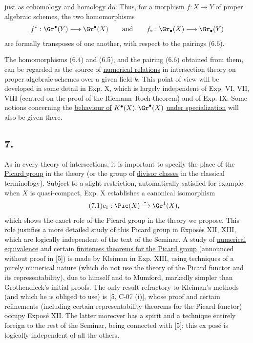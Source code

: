 just as cohomology and homology do. Thus, for a morphism $f:X\to Y$ of proper algebraic schemes, the two homomorphisms
\[
f^*:\Gr^\bullet(Y)\longrightarrow \Gr^\bullet(X)\qquad\text{and}\qquad f_*:\Gr_\bullet(X)\longrightarrow \Gr_\bullet(Y)
\]
are formally transposes of one another, with respect to the pairings (6.6).

The homomorphisms (6.4) and (6.5), and the pairing (6.6) obtained from them, can be regarded as the source of \uline{numerical relations} in intersection theory on proper algebraic schemes over a given field $k$. This point of view will be developed in some detail in Exp. X, which is largely independent of Exp. VI, VII, VIII (centred on the proof of the Riemann--Roch theorem) and of Exp. IX. Some notions concerning the \uline{behaviour of} $K^\bullet(X),\Gr^\bullet(X)$ \uline{under specialization} will also be given there.

\subsection*{7.}
As in every theory of intersections, it is important to specify the place of the \uline{Picard group} in the theory (or the group of \uline{divisor classes} in the classical terminology). Subject to a slight restriction, automatically satisfied for example when $X$ is quasi-compact, Exp. X establishes a canonical isomorphism
\begin{equation}\tag{7.1}
c_1:\Pic(X)\xrightarrow{\sim}\Gr^1(X),
\end{equation}
which shows the exact role of the Picard group in the theory we propose. This role justifies a more detailed study of this Picard group in Exposés XII, XIII, which are logically independent of the text of the Seminar. A study of \uline{numerical equivalence} and certain \uline{finiteness theorems for the Picard group} (announced without proof in [5]) is made by Kleiman in Exp. XIII, using techniques of a purely numerical nature (which do not use the theory of the Picard functor and its representability), due to himself and to Mumford, markedly simpler than Grothendieck's initial proofs. The only result refractory to Kleiman's methods (and which he is obliged to use) is [5, C-07 (i)], whose proof and certain refinements (including certain representability theorems for the Picard functor) occupy Exposé XII. The latter moreover has a spirit and a technique entirely foreign to the rest of the Seminar, being connected with [5]; this ex%
%
posé is logically independent of all the others.

